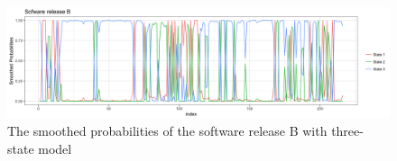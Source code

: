 \begin{figure}[H]
\begin{centering}
\includegraphics[scale=0.35]{picture/L16B_3_smo1}
\par\end{centering}
\caption{The smoothed probabilities of the software release B with three-state
model}
\label{L16B_3_smo}
\end{figure}

